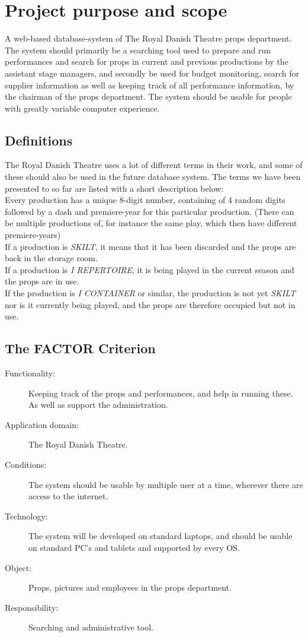 \documentclass[12pt]{article}
\begin{document}
\section{Project purpose and scope}
A web-based database-system of The Royal Danish Theatre props department. The system should primarily be a searching tool used to prepare and run performances and search for props in current and previous productions by the assistant stage managers, and secondly be used for budget monitoring, search for supplier information as well as keeping track of all performance information, by the chairman of the props department. The system should be usable for people with greatly variable computer experience.
\subsection{Definitions}
The Royal Danish Theatre uses a lot of different terms in their work, and some of these should also be used in the future database system. The terms we have been presented to so far are listed with a short description below: \\
Every production has a unique 8-digit number, containing of 4 random digits followed by a dash and premiere-year for this particular production. (There can be multiple productions of, for instance the same play, which then have different premiere-years) \\
If a production is \textit{SKILT}, it means that it has been discarded and the props are back in the storage room. \\
If a production is \textit{I REPERTOIRE}, it is being played in the current season and the props are in use. \\
If the production is \textit{I CONTAINER} or similar, the production is not yet \textit{SKILT} nor is it currently being played, and the props are therefore occupied but not in use.
\subsection{The FACTOR Criterion}
\begin{description}
  \item[Functionality:] Keeping track of the props and performances, and help in running these. As well as support the administration.
  \item[Application domain:] The Royal Danish Theatre.
  \item[Conditions:] The system should be usable by multiple user at a time, wherever there are access to the internet.
  \item[Technology:] The system will be developed on standard laptops, and should be usable on standard PC's and tablets and supported by every OS.
  \item[Object:] Props, pictures and employees in the props department.
  \item[Responsibility:] Searching and administrative tool.
\end{description}
\end{document}
